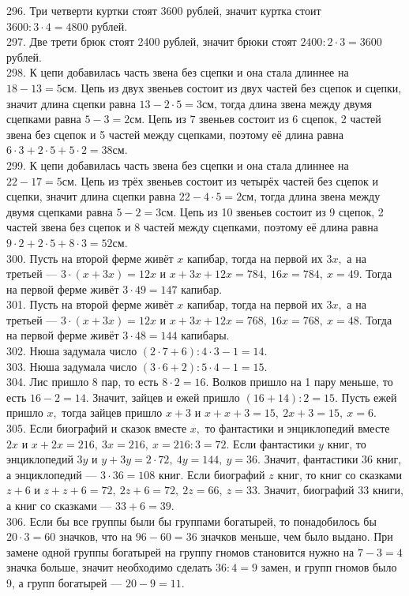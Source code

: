 \documentclass[12pt]{article}
\begin{document}
296. Три четверти куртки стоят 3600 рублей, значит куртка стоит $3600:3\cdot4=4800$ рублей.\\
297. Две трети брюк стоят 2400 рублей, значит брюки стоят $2400:2\cdot3=3600$ рублей.\\
298. К цепи добавилась часть звена без сцепки и она стала длиннее на $18-13=5$см. Цепь из двух звеньев состоит из двух частей без сцепок и сцепки, значит длина сцепки равна $13-2\cdot5=3$см, тогда длина звена между двумя сцепками равна $5-3=2$см. Цепь из 7 звеньев состоит из 6 сцепок, 2 частей звена без сцепок и 5 частей между сцепками, поэтому её длина равна $6\cdot3+2\cdot5+5\cdot2=38$см.\\
299. К цепи добавилась часть звена без сцепки и она стала длиннее на $22-17=5$см. Цепь из трёх звеньев состоит из четырёх частей без сцепок и сцепки, значит длина сцепки равна $22-4\cdot5=2$см, тогда длина звена между двумя сцепками равна $5-2=3$см. Цепь из 10 звеньев состоит из 9 сцепок, 2 частей звена без сцепок и 8 частей между сцепками, поэтому её длина равна $9\cdot2+2\cdot5+8\cdot3=52$см.\\
300. Пусть на второй ферме живёт $x$ капибар, тогда на первой их $3x,$ а на третьей --- $3\cdot(x+3x)=12x$ и $x+3x+12x=784,\ 16x=784,\ x=49.$ Тогда на первой ферме живёт $3\cdot49=147$ капибар.\\
301. Пусть на второй ферме живёт $x$ капибар, тогда на первой их $3x,$ а на третьей --- $3\cdot(x+3x)=12x$ и $x+3x+12x=768,\ 16x=768,\ x=48.$ Тогда на первой ферме живёт $3\cdot48=144$ капибары.\\
302. Нюша задумала число $(2\cdot7+6):4\cdot3-1=14.$\\
303. Нюша задумала число $(3\cdot6+2):5\cdot4-1=15.$\\
304. Лис пришло 8 пар, то есть $8\cdot2=16.$ Волков пришло на 1 пару меньше, то есть $16-2=14.$ Значит, зайцев и ежей пришло $(16+14):2=15.$ Пусть ежей пришло $x,$ тогда зайцев пришло $x+3$ и $x+x+3=15,\ 2x+3=15,\ x=6.$\\
305. Если биографий и сказок вместе $x,$ то фантастики и энциклопедий вместе $2x$ и $x+2x=216,\ 3x=216,\ x=216:3=72.$ Если фантастики $y$ книг, то энциклопедий $3y$ и $y+3y=2\cdot72,\ 4y=144,\ y=36.$ Значит, фантастики 36 книг, а энциклопедий --- $3\cdot36=108$ книг. Если биографий $z$ книг, то книг со сказками $z+6$ и $z+z+6=72,\ 2z+6=72,\ 2z=66,\ z=33.$ Значит, биографий 33 книги, а книг со сказками --- $33+6=39.$\\
306. Если бы все группы были бы группами богатырей, то понадобилось бы $20\cdot3=60$ значков, что на $96-60=36$ значков меньше, чем было выдано. При замене одной группы богатырей на группу гномов становится нужно на $7-3=4$ значка больше, значит необходимо сделать $36:4=9$ замен, и групп гномов было 9, а групп богатырей --- $20-9=11.$\\
\end{document}
